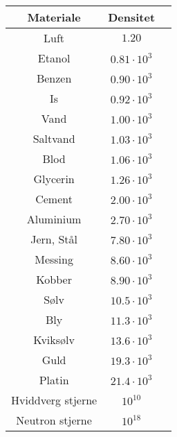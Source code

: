 \begin{tabular}{|c|c|c|}
	\hline
	Materiale&Densitet\\
	\hline
	Luft&$1.20$\\
	Etanol&$0.81\cdot 10^3$\\
	Benzen&$0.90\cdot 10^3$\\
	Is&$0.92\cdot 10^3$\\
	Vand&$1.00\cdot 10^3$\\
	Saltvand&$1.03\cdot 10^3$\\
	Blod&$1.06\cdot 10^3$\\
	Glycerin&$1.26\cdot 10^3$\\
	Cement&$2.00\cdot 10^3$\\
	Aluminium&$2.70\cdot 10^3$\\
	Jern, Stål&$7.80\cdot 10^3$\\
	Messing&$8.60\cdot 10^3$\\
	Kobber&$8.90\cdot 10^3$\\
	Sølv&$10.5\cdot 10^3$\\
	Bly&$11.3\cdot 10^3$\\
	Kviksølv&$13.6\cdot 10^3$\\
	Guld&$19.3\cdot 10^3$\\
	Platin&$21.4\cdot 10^3$\\
	Hviddverg stjerne&$10^10$\\
	Neutron stjerne&$10^18$\\
	\hline
\end{tabular}